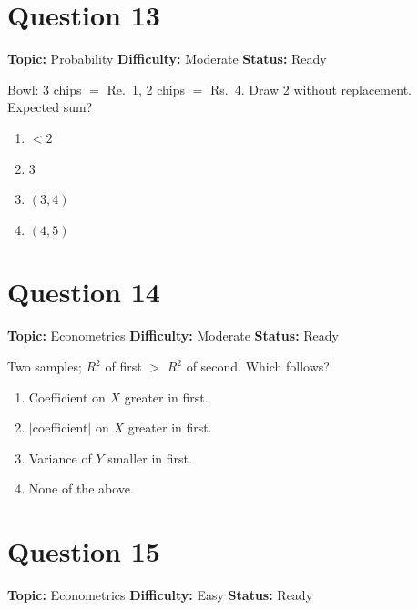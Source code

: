 \documentclass[11pt]{article}
\begin{document}
\newpage

\section*{Question 13}


\noindent\textbf{Topic:} Probability \quad \textbf{Difficulty:} Moderate \quad \textbf{Status:} Ready



Bowl: 3 chips $=$ Re.\ 1, 2 chips $=$ Rs.\ 4. Draw 2 without replacement. Expected sum?
\begin{enumerate}[label=(\Alph*)]
\item $<2$ \item $3$ \item $(3,4)$ \item $(4,5)$
\end{enumerate}

\newpage

\section*{Question 14}


\noindent\textbf{Topic:} Econometrics \quad \textbf{Difficulty:} Moderate \quad \textbf{Status:} Ready



Two samples; $R^2$ of first $>$ $R^2$ of second. Which follows?
\begin{enumerate}[label=(\Alph*)]
\item Coefficient on $X$ greater in first.
\item $|$coefficient$|$ on $X$ greater in first.
\item Variance of $Y$ smaller in first.
\item None of the above.
\end{enumerate}

\newpage

\section*{Question 15}


\noindent\textbf{Topic:} Econometrics \quad \textbf{Difficulty:} Easy \quad \textbf{Status:} Ready
\end{document}
